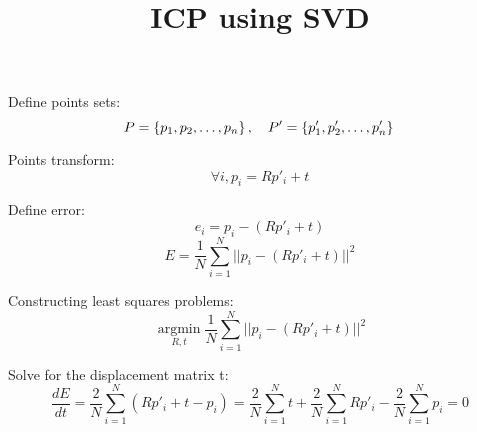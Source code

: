 \documentclass{article}
\title{ICP using SVD}
\begin{document}
\maketitle{}
\par
Define points sets:
\begin{equation}
    P = \left\{p_1, p_2, \ldots, p_n \right\}, \quad P' = \left\{p'_1, p'_2, \ldots, p'_n \right\}\\
\end{equation}
\par
Points transform:
\begin{equation}
\forall i, p_i = Rp'_i + t
\end{equation}
\par
Define error:
\begin{equation}
e_i = p_i - (Rp'_i + t)
\end{equation}
\begin{equation}
E = \frac{1}{N}\sum^{N}_{i=1}||p_i - (Rp'_i + t)||^2
\end{equation}
\par
Constructing least squares problems:
\begin{equation}
\mathop{\arg\min}\limits_{R,t}\frac{1}{N}\sum^{N}_{i=1}||p_i - (Rp'_i + t)||^2
\end{equation}
\par
Solve for the displacement matrix t:
\begin{equation}
\frac{dE}{dt}=\frac{2}{N}\sum^{N}_{i=1}(Rp'_i + t -p_i)=\frac{2}{N}\sum^{N}_{i=1}t+\frac{2}{N}\sum^{N}_{i=1}Rp'_i - \frac{2}{N}\sum^{N}_{i=1}p_i=0
\end{equation}
\end{document}
